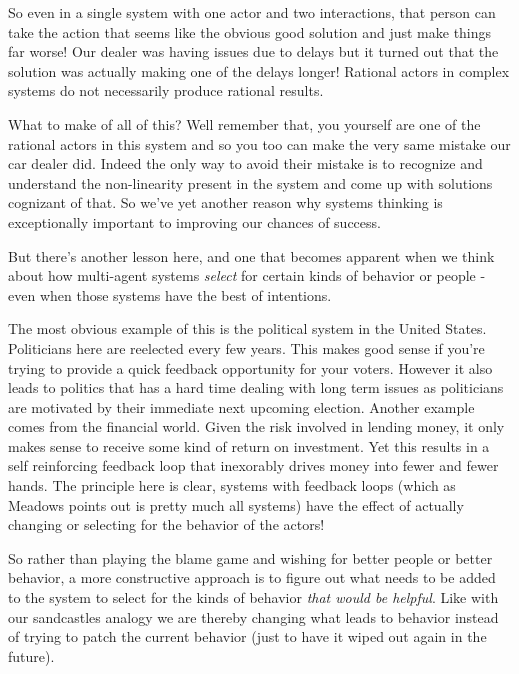 \documentclass[11pt]{book}
\begin{document}
So even in a single system with one actor and two interactions, that person can take the action that seems like the obvious good solution and just make things far worse! Our dealer was having issues due to delays but it turned out that the solution was actually making one of the delays longer! Rational actors in complex systems do not necessarily produce rational results. 
\newline

What to make of all of this? Well remember that, you yourself are one of the rational actors in this system and so you too can make the very same mistake our car dealer did. Indeed the only way to avoid their mistake is to recognize and understand the non-linearity present in the system and come up with solutions cognizant of that. So we've yet another reason why systems thinking is exceptionally important to improving our chances of success.
\newline

But there's another lesson here, and one that becomes apparent when we think about how multi-agent systems \textit{select} for certain kinds of behavior or people - even when those systems have the best of intentions.
\newline

The most obvious example of this is the political system in the United States. Politicians here are reelected every few years. This makes good sense if you're trying to provide a quick feedback opportunity for your voters. However it also leads to politics that has a hard time dealing with long term issues as politicians are motivated by their immediate next upcoming election. Another example comes from the financial world. Given the risk involved in lending money, it only makes sense to receive some kind of return on investment. Yet this results in a self reinforcing feedback loop that inexorably drives money into fewer and fewer hands. The principle here is clear, systems with feedback loops (which as Meadows points out is pretty much all systems) have the effect of actually changing or selecting for the behavior of the actors!
\newline

So rather than playing the blame game and wishing for better people or better behavior, a more constructive approach is to figure out what needs to be added to the system to select for the kinds of behavior \textit{that would be helpful}. Like with our sandcastles analogy we are thereby changing what leads to behavior instead of trying to patch the current behavior (just to have it wiped out again in the future). 
\newline
\end{document}
